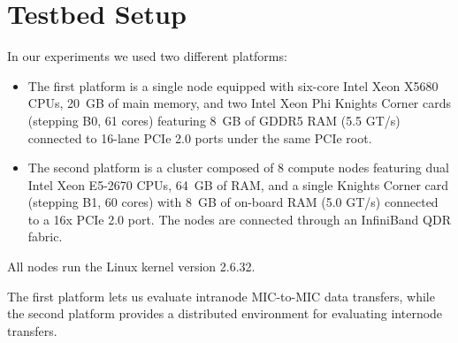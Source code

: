\section{Testbed Setup}
\label{sec:testbed}

In our experiments we used two different platforms:
\begin{itemize}
\item The first platform is a single node equipped with
  six-core Intel Xeon X5680 CPUs, 20~GB of main
  memory, and two Intel Xeon Phi Knights Corner cards (stepping B0,
  61 cores) featuring 8~GB of GDDR5 RAM (5.5 GT/s) connected to
  16-lane PCIe 2.0 ports under the same PCIe root.
\item The second platform is a cluster composed of 8 compute nodes
  featuring dual Intel Xeon E5-2670 CPUs, 64~GB of RAM, and a single Knights
  Corner card (stepping B1, 60 cores) with 8~GB of on-board RAM (5.0 GT/s)
  connected to a 16x PCIe 2.0 port. The nodes are connected through an
  InfiniBand QDR fabric.
\end{itemize}
All nodes run the Linux kernel version 2.6.32. 

The first platform lets us evaluate intranode MIC-to-MIC data
transfers, while the second platform provides a distributed
environment for evaluating internode transfers. 
